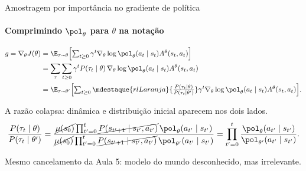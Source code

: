 \documentclass[aspectratio=169, 10pt]{beamer}
\newcommand{\thv}{\theta}
\newcommand{\polth}{\pol_{\thv}}
\newcommand{\gth}{\nabla_{\thv}}
\newcommand{\traj}{\tau}
\newcommand{\Adv}{A}
\begin{document}
\begin{frame}{Amostragem por importância no gradiente de política}
  \framesubtitle{Comprimindo $\polth$ para $\thv$ na notação}

  \begin{align*}
    g = \gth J(\thv)
      &= \E_{\traj\sim\thv}\Bigl[\textstyle\sum_{t\ge0}\gamma^t \gth\log\polth(a_t\mid s_t) \Adv^{\thv}(s_t,a_t)\Bigr]\\
      &= \sum_{\traj}\sum_{t\ge0}\gamma^t P(\traj_t\mid \thv)\,\gth\log\polth(a_t\mid s_t)\Adv^{\thv}(s_t,a_t)\\
      &= \E_{\traj\sim\thv'}\Bigl[\textstyle\sum_{t\ge0}
          \mdestaque{rlLaranja}{\frac{P(\traj_t\mid\thv)}{P(\traj_t\mid\thv')}}
          \gamma^t\gth\log\polth(a_t\mid s_t)\Adv^{\thv}(s_t,a_t)\Bigr].
  \end{align*}

  \pause
  A razão colapsa: dinâmica e distribuição inicial aparecem nos dois lados.
  \[
    \frac{P(\traj_t\mid\thv)}{P(\traj_t\mid\thv')}
      = \frac{\cancel{\mu(s_0)}\prod_{t'=0}^{t}\cancel{P(s_{t'+1}\mid s_{t'},a_{t'})}\,\polth(a_{t'}\mid s_{t'})}
             {\cancel{\mu(s_0)}\prod_{t'=0}^{t}\cancel{P(s_{t'+1}\mid s_{t'},a_{t'})}\,\pol_{\thv'}(a_{t'}\mid s_{t'})}
      = \prod_{t'=0}^{t}\frac{\polth(a_{t'}\mid s_{t'})}{\pol_{\thv'}(a_{t'}\mid s_{t'})}.
  \]

  \begin{ideiabox}
    Mesmo cancelamento da Aula 5: modelo do mundo desconhecido, mas irrelevante.
  \end{ideiabox}
\end{frame}
\end{document}
